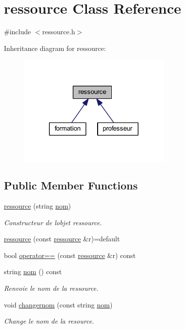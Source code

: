 \hypertarget{classressource}{}\section{ressource Class Reference}
\label{classressource}


{\ttfamily \#include $<$ressource.\+h$>$}



Inheritance diagram for ressource\+:\nopagebreak
\begin{figure}[H]
\begin{center}
\leavevmode
\includegraphics[width=216pt]{classressource__inherit__graph}
\end{center}
\end{figure}
\subsection*{Public Member Functions}
\begin{DoxyCompactItemize}
\item 
\hyperlink{classressource_a261f4c729d03d562e1d35187999ce4ef}{ressource} (string \hyperlink{classressource_aff712b6d732b3f4091dd29f4349aba85}{nom})
\begin{DoxyCompactList}\small\item\em Constructeur de l\textquotesingle{}objet ressource. \end{DoxyCompactList}\item 
\hyperlink{classressource_adccfe979d5ccf07ae4f0cfa944e9f1b0}{ressource} (const \hyperlink{classressource}{ressource} \&r)=default
\item 
bool \hyperlink{classressource_aed676709f755431a3cb2a5972bdbf0c0}{operator==} (const \hyperlink{classressource}{ressource} \&r) const
\item 
string \hyperlink{classressource_aff712b6d732b3f4091dd29f4349aba85}{nom} () const
\begin{DoxyCompactList}\small\item\em Renvoie le nom de la ressource. \end{DoxyCompactList}\item 
void \hyperlink{classressource_a2c2b1bee5ae87b3accdd84c088aef2fd}{changernom} (const string \hyperlink{classressource_aff712b6d732b3f4091dd29f4349aba85}{nom})
\begin{DoxyCompactList}\small\item\em Change le nom de la resource. \end{DoxyCompactList}\end{DoxyCompactItemize}


